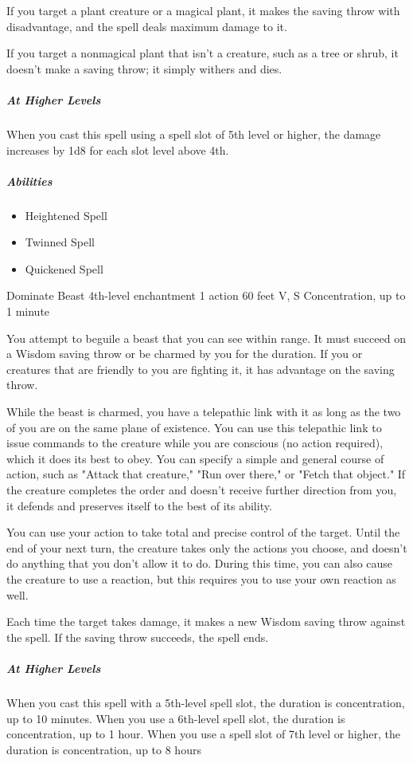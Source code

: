 \documentclass[a4paper,openany,twocolumn]{book}
\begin{document}
If you target a plant creature or a magical plant, it makes the saving throw with disadvantage, and the spell deals maximum damage to it. 
    
If you target a nonmagical plant that isn't a creature, such as a tree or shrub, it doesn't make a saving throw; it simply withers and dies.
    
\subparagraph*{At Higher Levels} When you cast this spell using a spell slot of 5th level or higher, the damage increases by 1d8 for each slot level above 4th.

\subparagraph*{Abilities}
\begin{itemize}
  \item Heightened Spell
  \item Twinned Spell
  \item Quickened Spell
\end{itemize}

\DndSpellHeader
  {Dominate Beast}
  {4th-level enchantment}
  {1 action}
  {60 feet}
  {V, S}
  {Concentration, up to 1 minute}

You attempt to beguile a beast that you can see within range. It must succeed on a Wisdom saving throw or be charmed by you for the duration. If you or creatures that are friendly to you are fighting it, it has advantage on the saving throw. 
    
While the beast is charmed, you have a telepathic link with it as long as the two of you are on the same plane of existence. You can use this telepathic link to issue commands to the creature while you are conscious (no action required), which it does its best to obey. You can specify a simple and  general course of action, such as "Attack that creature," "Run over there," or  "Fetch that object." If the creature completes the order and doesn't receive further direction from you, it defends and preserves itself to the best of its ability. 
    
You can use your action to take total and precise control of the  target. Until the end of your next turn, the creature takes only the actions you choose, and doesn't do anything that you don't allow it to do. During this time, you can also cause the creature to use a reaction, but this requires you to use your own reaction as well. 
    
Each time the target takes damage, it makes a new Wisdom saving throw against the spell. If the saving throw succeeds, the spell ends.
    
\subparagraph*{At Higher Levels} When you cast this spell with a 5th-level spell slot, the duration is concentration, up to 10 minutes.  When you use a 6th-level spell slot, the duration is concentration, up to 1 hour. When you use a spell slot of 7th level or higher, the duration is concentration, up to 8 hours
\end{document}
